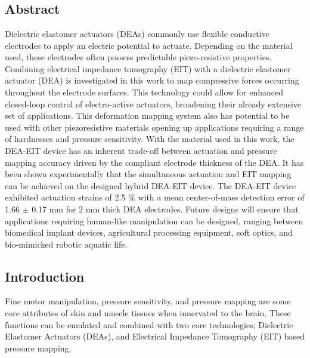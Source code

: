 \chapter{\chapviname}
\label{chapter6}



\section*{Abstract}
Dielectric elastomer actuators (DEAs) commonly use flexible conductive electrodes to apply an electric potential to actuate. Depending on the material used, these electrodes often possess predictable piezo-resistive properties. Combining electrical impedance tomography (EIT) with a dielectric elastomer actuator (DEA) is investigated in this work to map compressive forces occurring throughout the electrode surfaces. This technology could allow for enhanced closed-loop control of electro-active actuators, broadening their already extensive set of applications. This deformation mapping system also has potential to be used with other piezoresistive materials opening up applications requiring a range of hardnesses and pressure sensitivity. With the material used in this work, the DEA-EIT device has an inherent trade-off between actuation and pressure mapping accuracy driven by the compliant electrode thickness of the DEA. It has been shown experimentally that the simultaneous actuation and EIT mapping can be achieved on the designed hybrid DEA-EIT device. The DEA-EIT device exhibited actuation strains of 2.5 \% with a mean center-of-mass detection error of 1.66 $\pm$ 0.17 mm for 2 mm thick DEA electrodes. Future designs will ensure that applications requiring human-like manipulation can be designed, ranging between biomedical implant devices, agricultural processing equipment, soft optics, and bio-mimicked robotic aquatic life. 



\section{Introduction} %
\label{sec:introduction}
Fine motor manipulation, pressure sensitivity, and pressure mapping are some core attributes of skin and muscle tissues when innervated to the brain. These functions can be emulated and combined with two core technologies; Dielectric Elastomer Actuators (DEAs), and Electrical Impedance Tomography (EIT) based pressure mapping.

